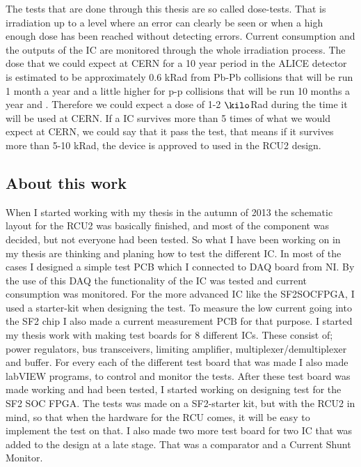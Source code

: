 \begin{section}
The tests that are done through this thesis are so called dose-tests. That is irradiation up to a level where an error can clearly be seen or when a high enough dose has been reached without detecting errors.
Current consumption and the outputs of the \ac{IC} are monitored through the whole irradiation process.
The dose that we could expect at \ac{CERN} for a 10 year period in the ALICE detector is estimated to be approximately 0.6 kRad from Pb-Pb collisions that will be run 1 month a year and a little higher for p-p collisions that will be run 10 months a year \cite{georgios} and \cite{roed}.
Therefore we could expect a dose of 1-2 $\kilo$Rad during the time it will be used at CERN.
If a \ac{IC} survives more than 5 times of what we would expect at \ac{CERN}, we could say that it pass the test, that means if it survives more than 5-10 kRad, the device is approved to used in the \ac{RCU2} design.

\subsection{About this work}
When I started working with my thesis in the autumn of 2013 the schematic layout for the \ac{RCU2} was basically finished, and most of the component was decided, but not everyone had been tested.
So what I have been working on in my thesis are thinking and planing how to test the different \ac{IC}.
In most of the cases I designed a simple test \ac{PCB} which I connected to \acf{DAQ} board from \ac{NI}. By the use of this \ac{DAQ} the functionality of the \ac{IC} was tested and current consumption was monitored.
For the more advanced \ac{IC} like the \ac{SF2}\acf{SOC}\ac{FPGA}, I used a starter-kit when designing the test. To measure the low current going into the \ac{SF2} chip I also made a current measurement \ac{PCB} for that purpose.
I started my thesis work with making test boards for 8 different \ac{IC}s. These consist of; power regulators, bus transceivers, limiting amplifier, multiplexer/demultiplexer and buffer.
For every each of the different test board that was made I also made labVIEW programs, to control and monitor the tests.
After these test board was made working and had been tested, I started working on designing test for the \ac{SF2} \ac{SOC} \ac{FPGA}.
The tests was made on a \ac{SF2}-starter kit, but with the \ac{RCU2} in mind, so that when the hardware for the \ac{RCU} comes, it will be easy to implement the test on that.
I also made two more test board for two IC that was added to the design at a late stage. That was a comparator and a Current Shunt Monitor.

\end{section}
